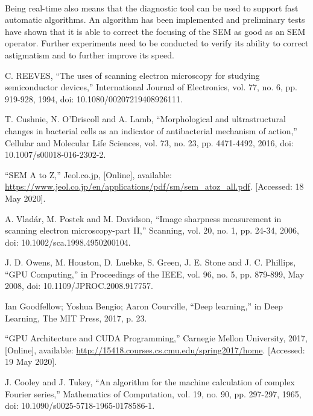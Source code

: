 \documentclass[12pt, twocolumn]{report}
\begin{document}
\paragraph{}
Being real-time also means that the diagnostic tool can be used to support fast automatic algorithms. An algorithm has been implemented and preliminary tests have shown that it is able to correct the focusing of the SEM as good as an SEM operator. Further experiments need to be conducted to verify its ability to correct astigmatism and to further improve its speed.

\begin{thebibliography}{00}
    C. REEVES, ``The uses of scanning electron microscopy for studying semiconductor devices,'' International Journal of Electronics, vol. 77, no. 6, pp. 919-928, 1994, doi: 10.1080/00207219408926111.

    T. Cushnie, N. O’Driscoll and A. Lamb, ``Morphological and ultrastructural changes in bacterial cells as an indicator of antibacterial mechanism of action,'' Cellular and Molecular Life Sciences, vol. 73, no. 23, pp. 4471-4492, 2016, doi: 10.1007/s00018-016-2302-2.

    ``SEM A to Z,'' Jeol.co.jp, [Online], available: \url{https://www.jeol.co.jp/en/applications/pdf/sm/sem_atoz_all.pdf}. [Accessed: 18 May 2020].

    A. Vladár, M. Postek and M. Davidson, ``Image sharpness measurement in scanning electron microscopy-part II,'' Scanning, vol. 20, no. 1, pp. 24-34, 2006, doi: 10.1002/sca.1998.4950200104.

    J. D. Owens, M. Houston, D. Luebke, S. Green, J. E. Stone and J. C. Phillips, ``GPU Computing,'' in Proceedings of the IEEE, vol. 96, no. 5, pp. 879-899, May 2008, doi: 10.1109/JPROC.2008.917757.

    Ian Goodfellow; Yoshua Bengio; Aaron Courville, ``Deep learning,'' in Deep Learning, The MIT Press, 2017, p. 23.

    ``GPU Architecture and CUDA Programming,'' Carnegie Mellon University, 2017, [Online], available: \url{http://15418.courses.cs.cmu.edu/spring2017/home}. [Accessed: 19 May 2020].

    J. Cooley and J. Tukey, ``An algorithm for the machine calculation of complex Fourier series,'' Mathematics of Computation, vol. 19, no. 90, pp. 297-297, 1965, doi: 10.1090/s0025-5718-1965-0178586-1.


\end{thebibliography}
\end{document}

